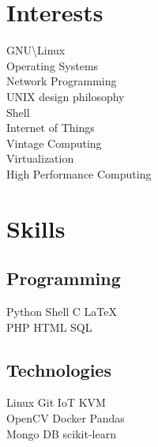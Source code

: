 \documentclass[]{resume_karuvally_openfont}
\begin{document}
\begin{minipage}[t]{0.33\textwidth}
\section{Interests}
GNU\textbackslash Linux \\
Operating Systems \\
Network Programming \\
UNIX design philosophy \\
Shell \\
Internet of Things \\
Vintage Computing \\
Virtualization \\
High Performance Computing
\sectionsep


\section{Skills}
\subsection{Programming}
Python \textbullet{} Shell \textbullet{} C \textbullet{} \LaTeX \\
PHP \textbullet{} HTML \textbullet{} SQL
\sectionsep

\subsection{Technologies}
Linux \textbullet{} Git \textbullet{} IoT \textbullet{} KVM \\
OpenCV \textbullet{} Docker \textbullet{} Pandas \\
Mongo DB \textbullet{} scikit-learn
\sectionsep

%
%

\end{minipage} 
\hfill
\end{document}
